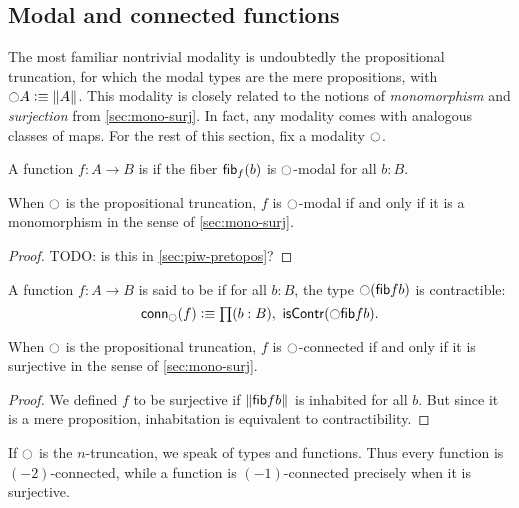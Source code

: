 \subsection{Modal and connected functions}
\label{subsec:connectivity}

The most familiar nontrivial modality is undoubtedly the propositional truncation, for which the modal types are the mere propositions, with $\ocircle A \vcentcolon\equiv \Vert A\Vert_{}$.
This modality is closely related to the notions of \emph{monomorphism} and \emph{surjection} from \autoref{sec:mono-surj}.
In fact, any modality comes with analogous classes of maps.
For the rest of this section, fix a modality $\ocircle$.

\begin{defn}
  A function $f:A\to B$ is  if the fiber ${\mathsf{fib}}_{f}(b)$ is $\ocircle$-modal for all $b:B$.
\end{defn}

\begin{lem}\label{thm:modal-mono}
  When $\ocircle$ is the propositional truncation, $f$ is $\ocircle$-modal if and only if it is a monomorphism in the sense of \autoref{sec:mono-surj}.
\end{lem}
\begin{proof}
  TODO: is this in \autoref{sec:piw-pretopos}?
\end{proof}

\begin{defn}
A function $f:A\to B$ is said to be  if for all $b:B$, the type $\ocircle({\mathsf{fib}} f b)$ is contractible:
\begin{equation*}
  \mathsf{conn}_\modal(f)\defeq \prd{b:B}\iscontr(\modal\hfiber{f}b). 
\end{equation*}
\end{defn}

\begin{lem}
  When $\ocircle$ is the propositional truncation, $f$ is $\ocircle$-connected if and only if it is surjective in the sense of \autoref{sec:mono-surj}.
\end{lem}
\begin{proof}
  We defined $f$ to be surjective if $\Vert {\mathsf{fib}} f b\Vert_{}$ is inhabited for all $b$.
  But since it is a mere proposition, inhabitation is equivalent to contractibility.
\end{proof}

\begin{eg}
  If $\ocircle$ is the $n$-truncation, we speak of  types and functions.
  Thus every function is $(-2)$-connected, while a function is $(-1)$-connected precisely when it is surjective.
\end{eg}

